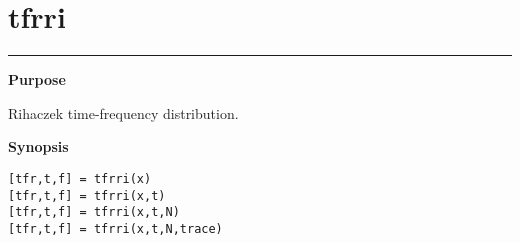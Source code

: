 

\section*{\hspace*{-1.6cm} tfrri}

\vspace*{-.4cm}
\hspace*{-1.6cm}\rule[0in]{16.5cm}{.02cm}
\vspace*{.2cm}

{\bf \large \sf Purpose}\\
\hspace*{1.5cm}
\begin{minipage}[t]{13.5cm}
Rihaczek time-frequency distribution.
\end{minipage}
\vspace*{.3cm}

{\bf \large \sf Synopsis}\\
\hspace*{1.5cm}
\begin{minipage}[t]{13.5cm}
\begin{verbatim}
[tfr,t,f] = tfrri(x)
[tfr,t,f] = tfrri(x,t)
[tfr,t,f] = tfrri(x,t,N)
[tfr,t,f] = tfrri(x,t,N,trace)
\end{verbatim}
\end{minipage}
\vspace*{.5cm}

